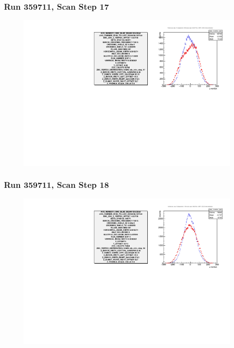 \begin{frame}
\frametitle{Run 359711, Scan Step 17}
\begin{figure}
\begin{center}
\includegraphics[width=\linewidth]{"figs/359711_step_17_zdc_zvertex"}
\caption{ }
\label{fig:359711_step_17_zdc_zvertex}
\end{center}\end{figure}
\end{frame}

\begin{frame}
\frametitle{Run 359711, Scan Step 18}
\begin{figure}
\begin{center}
\includegraphics[width=\linewidth]{"figs/359711_step_18_zdc_zvertex"}
\caption{ }
\label{fig:359711_step_18_zdc_zvertex}
\end{center}\end{figure}
\end{frame}

